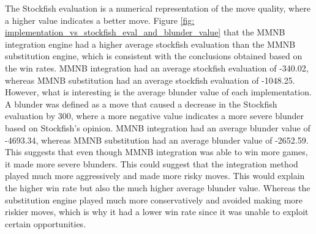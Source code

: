 








The Stockfish evaluation is a numerical representation of the move quality, where a higher value indicates a better move. Figure \ref{fig: implementation_vs_stockfish_eval_and_blunder_value} that the MMNB integration engine had a higher average stockfish evaluation than the MMNB substitution engine, which is consistent with the conclusions obtained based on the win rates. MMNB integration had an average stockfish evaluation of -340.02, whereas MMNB substitution had an average stockfish evaluation of -1048.25. However, what is interesting is the average blunder value of each implementation. A blunder was defined as a move that caused a decrease in the Stockfish evaluation by 300, where a more negative value indicates a more severe blunder based on Stockfish's opinion. MMNB integration had an average blunder value of -4693.34, whereas MMNB substitution had an average blunder value of -2652.59. This suggests that even though MMNB integration was able to win more games, it made more severe blunders. This could suggest that the integration method played much more aggressively and made more risky moves. This would explain the higher win rate but also the much higher average blunder value. Whereas the substitution engine played much more conservatively and avoided making more riskier moves, which is why it had a lower win rate since it was unable to exploit certain opportunities. 

